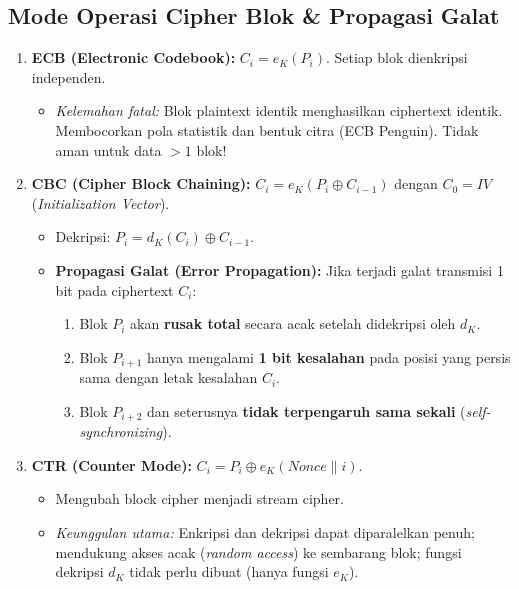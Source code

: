 \documentclass[11pt,a4paper]{article}
\begin{document}
\subsection{Mode Operasi Cipher Blok \& Propagasi Galat}
\begin{enumerate}[leftmargin=*]
    \item \textbf{ECB (Electronic Codebook):} $C_i = e_K(P_i)$. Setiap blok dienkripsi independen.
    \begin{itemize}
        \item \textit{Kelemahan fatal:} Blok plaintext identik menghasilkan ciphertext identik. Membocorkan pola statistik dan bentuk citra (ECB Penguin). Tidak aman untuk data $> 1$ blok!
    \end{itemize}
    \item \textbf{CBC (Cipher Block Chaining):} $C_i = e_K(P_i \oplus C_{i-1})$ dengan $C_0 = IV$ (\textit{Initialization Vector}).
    \begin{itemize}
        \item Dekripsi: $P_i = d_K(C_i) \oplus C_{i-1}$.
        \item \textbf{Propagasi Galat (Error Propagation):} Jika terjadi galat transmisi 1 bit pada ciphertext $C_i$:
        \begin{enumerate}
            \item Blok $P_i$ akan \textbf{rusak total} secara acak setelah didekripsi oleh $d_K$.
            \item Blok $P_{i+1}$ hanya mengalami \textbf{1 bit kesalahan} pada posisi yang persis sama dengan letak kesalahan $C_i$.
            \item Blok $P_{i+2}$ dan seterusnya \textbf{tidak terpengaruh sama sekali} (\textit{self-synchronizing}).
        \end{enumerate}
    \end{itemize}
    \item \textbf{CTR (Counter Mode):} $C_i = P_i \oplus e_K(Nonce \parallel i)$.
    \begin{itemize}
        \item Mengubah block cipher menjadi stream cipher.
        \item \textit{Keunggulan utama:} Enkripsi dan dekripsi dapat diparalelkan penuh; mendukung akses acak (\textit{random access}) ke sembarang blok; fungsi dekripsi $d_K$ tidak perlu dibuat (hanya fungsi $e_K$).
    \end{itemize}
\end{enumerate}
\end{document}
